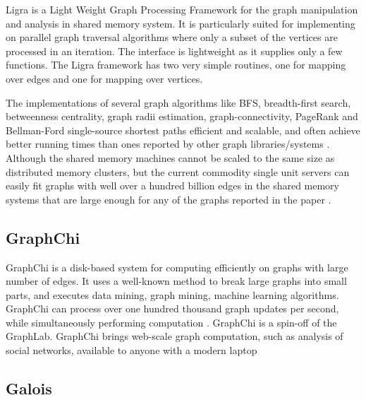      Ligra is a Light Weight Graph Processing Framework for the graph
     manipulation and analysis in shared memory system. It is
     particularly suited for implementing on parallel graph traversal
     algorithms where only a subset of the vertices are processed in an
     iteration. The interface is lightweight as it supplies only a
     few functions. The Ligra framework has two very simple routines,
     one for mapping over edges and one for mapping over vertices.

     The implementations of several graph algorithms like BFS,
     breadth-first search, betweenness centrality, graph radii
     estimation, graph-connectivity, PageRank and Bellman-Ford
     single-source shortest paths efficient and scalable, and often
     achieve better running times than ones reported by other graph
     libraries/systems \cite{ligra-paper-2013}.  Although the shared
     memory machines cannot be scaled to the same size as distributed
     memory clusters, but the current commodity single unit servers
     can easily fit graphs with well over a hundred billion edges in
     the shared memory systems that are large enough for any of the
     graphs reported in the paper \cite{ligra-paper-2}.

\subsection{GraphChi}

     GraphChi is a disk-based system for computing
     efficiently on graphs with large number of edges.  It uses a
     well-known method to break large graphs into small parts, and
     executes data mining, graph mining, machine learning
     algorithms. GraphChi can process over one hundred thousand graph
     updates per second, while simultaneously performing
     computation \cite{GraphChi}. GraphChi is a spin-off of the
     GraphLab. GraphChi brings web-scale graph computation, such as
     analysis of social networks, available to anyone with a modern
     laptop

     
\subsection{Galois}
     

